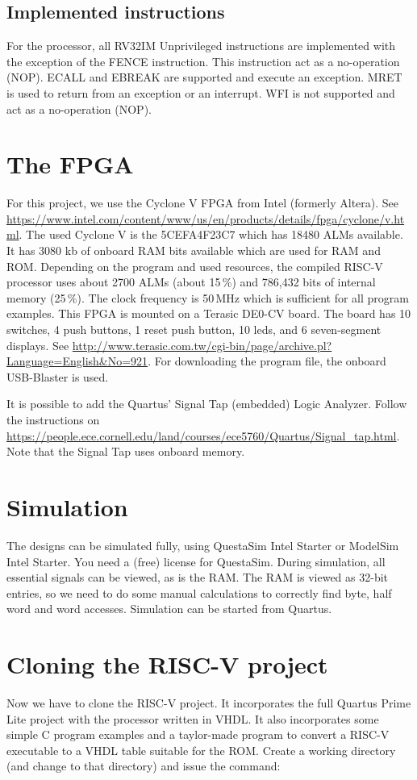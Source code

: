 \documentclass[12pt]{article}
\begin{document}
\subsection{Implemented instructions}
For the processor, all RV32IM Unprivileged instructions are implemented with the exception of the FENCE instruction. This instruction act as a no-operation (NOP). ECALL and EBREAK are supported and execute an exception. MRET is used to return from an exception or an interrupt. WFI is not supported and act as a no-operation (NOP).

\section{The FPGA}
For this project, we use the Cyclone V FPGA from Intel (formerly Altera). See \url{https://www.intel.com/content/www/us/en/products/details/fpga/cyclone/v.html}.
The used Cyclone V is the 5CEFA4F23C7 which has 18480 ALMs available. It has 3080 kb of onboard RAM bits available which are used for RAM and ROM. Depending on the program and used resources, the compiled RISC-V processor uses about 2700 ALMs (about 15\,\%) and 786,432 bits of internal memory (25\,\%). The clock frequency is 50\,MHz which is sufficient for all program examples. This FPGA is mounted on a Terasic DE0-CV board. The board has 10 switches, 4 push buttons, 1 reset push button, 10 leds, and 6 seven-segment displays. See \url{http://www.terasic.com.tw/cgi-bin/page/archive.pl?Language=English&No=921}. For downloading the program file, the onboard USB-Blaster is used.

It is possible to add the Quartus' Signal Tap (embedded) Logic Analyzer. Follow the instructions on \url{https://people.ece.cornell.edu/land/courses/ece5760/Quartus/Signal_tap.html}. Note that the Signal Tap uses onboard memory.

\section{Simulation}
The designs can be simulated fully, using QuestaSim Intel Starter or ModelSim Intel Starter. You need a (free) license for QuestaSim. During simulation, all essential signals can be viewed, as is the RAM. The RAM is viewed as 32-bit entries, so we need to do some manual calculations to correctly find byte, half word and word accesses. Simulation can be started from Quartus.

\section{Cloning the RISC-V project}
\label{sec:cloning}
Now we have to clone the RISC-V project. It incorporates the full Quartus Prime Lite project with the processor written in VHDL. It also incorporates some simple C program examples and a taylor-made program to convert a RISC-V executable to a VHDL table suitable for the ROM. Create a working directory (and change to that directory) and issue the command:
\end{document}
